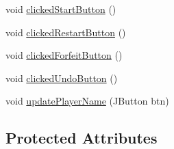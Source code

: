 \begin{DoxyCompactItemize}
\item 
void \hyperlink{classchess_1_1_game_controller_a152dd59c8605ceab2b0ca60097097f5e}{clicked\+Start\+Button} ()
\item 
void \hyperlink{classchess_1_1_game_controller_a22800c136daed1f9208be17e1c8b9c64}{clicked\+Restart\+Button} ()
\item 
void \hyperlink{classchess_1_1_game_controller_a76b4903a383e6b16e4cd8ad85dbeda90}{clicked\+Forfeit\+Button} ()
\item 
void \hyperlink{classchess_1_1_game_controller_ae179437fea74f6aa6ce03efd8b786b12}{clicked\+Undo\+Button} ()
\item 
void \hyperlink{classchess_1_1_game_controller_aa74fdd8304cba081746e040df2a2a4bb}{update\+Player\+Name} (J\+Button btn)
\end{DoxyCompactItemize}
\subsection*{Protected Attributes}
